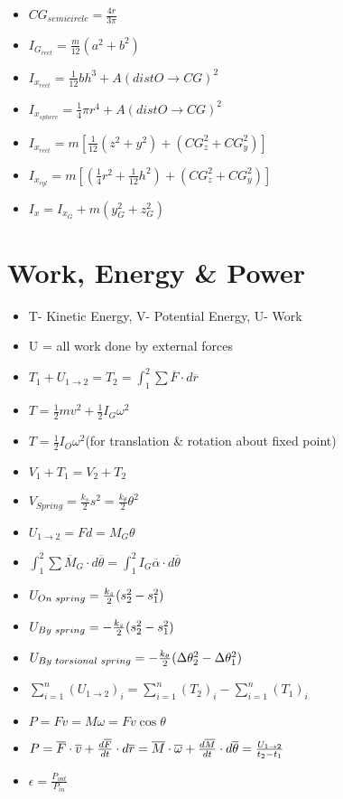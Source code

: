 \documentclass [10pt] {article}
\begin{document}
\begin{multicols*}{2}
\begin{itemize}
		\item $CG_{semicircle}=\frac{4r}{3\pi} $
		\item $I_{G_{rect}} = \frac{m}{12}(a^2 + b^2) $
		\item $I_{x_{rect}} = \frac{1}{12}bh^3 + A(dist O\rightarrow CG)^2 $
		\item $I_{x_{sphere}} = \frac{1}{4}\pi r^4 + A(dist O\rightarrow CG)^2 $
		\item $I_{x_{rect}} = m[\frac{1}{12}(z^2 + y^2) + (CG_z^2 + CG_y^2)] $
		\item $I_{x_{cyl}} = m[(\frac{1}{4}r^2 + \frac{1}{12}h^2) + (CG_z^2 + CG_y^2)] $
		\item $I_x = I_{x_G} + m(y_G^2 + z_G^2) $
	\end{itemize}
\section{Work, Energy \& Power}
	\begin{itemize}
		\item T- Kinetic Energy, V- Potential Energy, U- Work
		\item U = all work done by external forces
		\item $T_1 + U_{1 \rightarrow 2} = T_2 = \int_1^2 \sum \overline{F}\cdot d\overline{r}$
		\item $T = \frac{1}{2}mv^2 + \frac{1}{2}I_G\omega^2 $
		\item $T = \frac{1}{2}I_O\omega^2 $(for translation \& rotation about fixed point)
		\item $V_1 + T_1 = V_2 + T_2 $
		\item $V_{Spring} = \frac{k_s}{2}s^2 = \frac{k_{\theta}}{2}\theta^2 $
		\item $U_{1 \rightarrow 2} = Fd = M_G\theta $
		\item $\int_1^2 \sum\overline{M}_G\cdot d\overline{\theta} = \int_1^2 I_G \overline{\alpha} \cdot d\overline{\theta} $
		\item $U_{On \hspace{1mm} spring} = \frac{k_s}{2}(s_2^2 - s_1^2) $
		\item $U_{By \hspace{1mm} spring} = -\frac{k_s}{2}(s_2^2 - s_1^2) $
		\item $U_{By \hspace{1mm} torsional \hspace{1mm} spring} = -\frac{k_{\theta}}{2}(\Delta\theta_2^2 - \Delta\theta_1^2) $
		\item $\sum\limits_{i=1}^n (U_{1 \rightarrow 2})_i = \sum\limits_{i=1}^n (T_2)_i - \sum\limits_{i=1}^n (T_1)_i  $
		\item $P = Fv = M\omega = Fv\cos{\theta} $
		\item $P = \overline{F}\cdot\overline{v} + \frac{d\overline{F}}{dt}\cdot d\overline{r} = \overline{M}\cdot\overline{\omega} + \frac{d\overline{M}}{dt}\cdot d\overline{\theta} \\ = \frac{U_{1 \rightarrow 2}}{t_2 - t_1} $
		\item $\epsilon = \frac{P_{out}}{P_{in}} $
	\end{itemize}

\end{multicols*}
\end{document}
